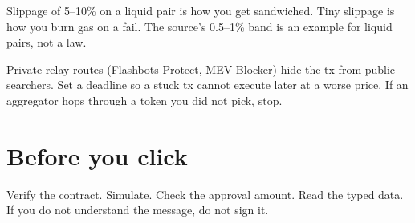 Slippage of 5--10\% on a liquid pair is how you get
sandwiched. Tiny slippage is how you burn gas on a
fail. The source's 0.5--1\% band is an example for
liquid pairs, not a law.

Private relay routes (Flashbots Protect, MEV Blocker)
hide the tx from public searchers. Set a deadline so a
stuck tx cannot execute later at a worse price. If an
aggregator hops through a token you did not pick, stop.

\section{Before you click}

Verify the contract. Simulate. Check the approval
amount. Read the typed data. If you do not understand
the message, do not sign it.
